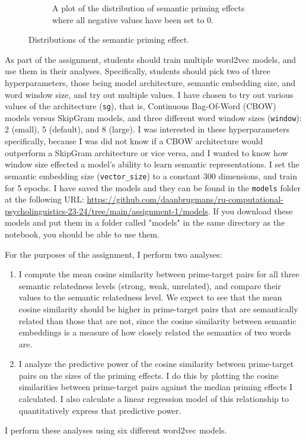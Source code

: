 \documentclass{IEEEtran}
\begin{document}
\begin{figure}
\begin{subfigure}{0.4\textwidth}
        \caption{A plot of the distribution of semantic priming effects where all negative values have been set to 0.}
        \label{fig:semantic_priming_normalized}
    \end{subfigure}
    \caption{Distributions of the semantic priming effect.}
\end{figure}

As part of the assignment, students should train multiple word2vec models, and use them in their analyses.
Specifically, students should pick two of three hyperparameters, those being model architecture, semantic embedding size, and word window size, and try out multiple values.
I have chosen to try out various values of the architecture (\texttt{sg}), that is, Continuous Bag-Of-Word (CBOW) models versus SkipGram models, and three different word window sizes (\texttt{window}): 2 (small), 5 (default), and 8 (large).
I was interested in these hyperparameters specifically, because I was did not know if a CBOW architecture would outperform a SkipGram architecture or vice versa, and I wanted to know how window size effected a model's ability to learn semantic representations.
I set the semantic embedding size (\texttt{vector\_size}) to a constant 300 dimensions, and train for 5 epochs.
I have saved the models and they can be found in the \texttt{models} folder at the following URL: \url{https://github.com/daanbrugmans/ru-computational-psycholinguistics-23-24/tree/main/assignment-1/models}.
If you download these models and put them in a folder called "models" in the same directory as the notebook, you should be able to use them.

For the purposes of the assignment, I perform two analyses:
\begin{enumerate}
    \item I compute the mean cosine similarity between prime-target pairs for all three semantic relatedness levels (strong, weak, unrelated), and compare their values to the semantic relatedness level.
    We expect to see that the mean cosine similarity should be higher in prime-target pairs that are semantically related than those that are not, since the cosine similarity between semantic embeddings is a measure of how closely related the semantics of two words are.
    \item I analyze the predictive power of the cosine similarity between prime-target pairs on the sizes of the priming effects.
    I do this by plotting the cosine similarities between prime-target pairs against the median priming effects I calculated.
    I also calculate a linear regression model of this relationship to quantitatively express that predictive power.    
\end{enumerate} 
I perform these analyses using six different word2vec models.
\end{document}

